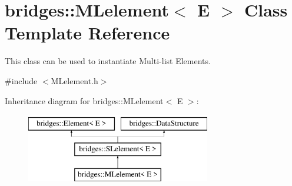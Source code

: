 \hypertarget{classbridges_1_1_m_lelement}{}\section{bridges\+:\+:M\+Lelement$<$ E $>$ Class Template Reference}
\label{classbridges_1_1_m_lelement}


This class can be used to instantiate Multi-\/list Elements.  




{\ttfamily \#include $<$M\+Lelement.\+h$>$}

Inheritance diagram for bridges\+:\+:M\+Lelement$<$ E $>$\+:\begin{figure}[H]
\begin{center}
\leavevmode
\includegraphics[height=3.000000cm]{classbridges_1_1_m_lelement}
\end{center}
\end{figure}
